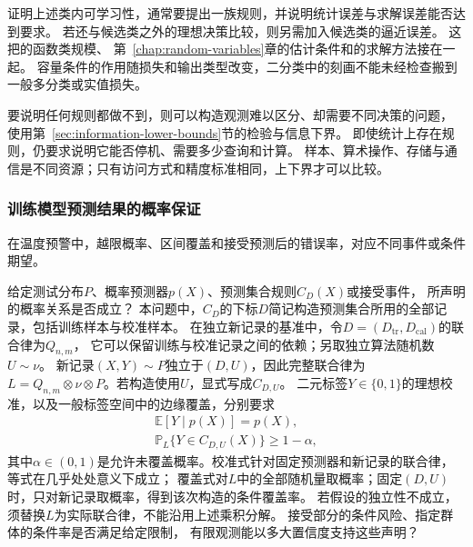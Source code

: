 证明上述类内可学习性，通常要提出一族规则，并说明统计误差与求解误差能否达到要求。
若还与候选类之外的理想决策比较，则另需加入候选类的逼近误差。
这把的函数类规模、
第~\ref{chap:random-variables}章的估计条件和的求解方法接在一起。
容量条件的作用随损失和输出类型改变，二分类中的刻画不能未经检查搬到一般多分类或实值损失。

要说明任何规则都做不到，则可以构造观测难以区分、却需要不同决策的问题，
使用第~\ref{sec:information-lower-bounds}节的检验与信息下界。
即使统计上存在规则，仍要求说明它能否停机、需要多少查询和计算。
样本、算术操作、存储与通信是不同资源；只有访问方式和精度标准相同，上下界才可以比较。

\subsubsection{训练模型预测结果的概率保证}
\label{sec:future-analysis-reliability}

在温度预警中，越限概率、区间覆盖和接受预测后的错误率，对应不同事件或条件期望。

\begin{mathproblem}[预测与决策的概率关系是否满足要求]
  \label{question:future-reliability}
  给定测试分布$P$、概率预测器$p(X)$、预测集合规则$C_D(X)$或接受事件，
  所声明的概率关系是否成立？
  本问题中，$C_D$的下标$D$简记构造预测集合所用的全部记录，包括训练样本与校准样本。
  在独立新记录的基准中，令$D=(D_{\mathrm{tr}},D_{\mathrm{cal}})$的联合律为$Q_{n,m}$，
  它可以保留训练与校准记录之间的依赖；另取独立算法随机数$U\sim\nu$。
  新记录$(X,Y)\sim P$独立于$(D,U)$，因此完整联合律为
  $L=Q_{n,m}\otimes\nu\otimes P$。若构造使用$U$，显式写成$C_{D,U}$。
  二元标签$Y\in\{0,1\}$的理想校准，以及一般标签空间中的边缘覆盖，分别要求
  \[
    \begin{gathered}
      \mathbb E[Y\mid p(X)]=p(X),\\
      \mathbb P_L\{Y\in C_{D,U}(X)\}\geq1-\alpha,
    \end{gathered}
  \]
  其中$\alpha\in(0,1)$是允许未覆盖概率。校准式针对固定预测器和新记录的联合律，等式在几乎处处意义下成立；
  覆盖式对$L$中的全部随机量取概率；固定$(D,U)$时，只对新记录取概率，得到该次构造的条件覆盖率。
  若假设的独立性不成立，须替换$L$为实际联合律，不能沿用上述乘积分解。
  接受部分的条件风险、指定群体的条件率是否满足给定限制，
  有限观测能以多大置信度支持这些声明？
\end{mathproblem}

